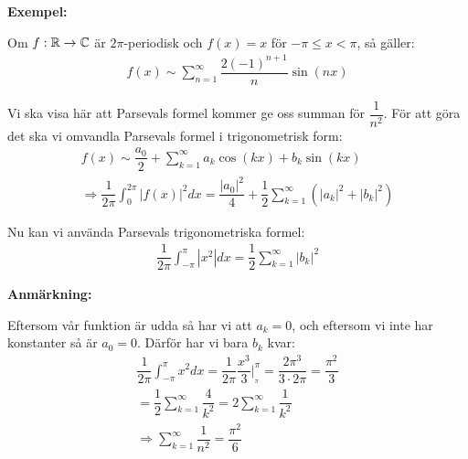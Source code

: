 \par\bigskip
\noindent\textbf{Exempel:}\par
\noindent Om $f:\mathbb{R}\to\mathbb{C}$ är $2\pi$-periodisk och $f(x) = x$ för $-\pi\leq x<\pi$, så gäller:
\begin{equation*}
  \begin{gathered}
    f(x)\sim \sum_{n=1}^{\infty}\dfrac{2(-1)^{n+1}}{n}\sin(nx)
  \end{gathered}
\end{equation*}
\par\bigskip
\noindent Vi ska visa här att Parsevals formel kommer ge oss summan för $\dfrac{1}{n^2}$. För att göra det ska vi omvandla Parsevals formel i trigonometrisk form:
\begin{equation*}
  \begin{gathered}
    f(x)\sim\dfrac{a_0}{2}+\sum_{k=1}^{\infty}a_k\cos(kx)+b_k\sin(kx)\\
    \Rightarrow \dfrac{1}{2\pi}\int_{0}^{2\pi}\left|f(x)\right|^2dx = \dfrac{\left|a_0\right|^2}{4}+\dfrac{1}{2}\sum_{k=1}^{\infty}\left(\left|a_k\right|^2+\left|b_k\right|^2\right)
  \end{gathered}
\end{equation*}
\par\bigskip
\noindent Nu kan vi använda Parsevals trigonometriska formel:
\begin{equation*}
  \begin{gathered}
    \dfrac{1}{2\pi}\int_{-\pi}^{\pi}\left|x^2\right|dx = \dfrac{1}{2}\sum_{k=1}^{\infty}\left|b_k\right|^2
  \end{gathered}
\end{equation*}
\par\bigskip
\noindent\textbf{Anmärkning:}\par
\noindent Eftersom vår funktion är udda så har vi att $a_k = 0$, och eftersom vi inte har konstanter så är $a_0=0$. Därför har vi bara $b_k$ kvar:
\begin{equation*}
  \begin{gathered}
    \dfrac{1}{2\pi}\int_{-\pi}^{\pi}x^2dx = \dfrac{1}{2\pi}\dfrac{x^3}{3}|_{_\pi}^\pi = \dfrac{2\pi^3}{3\cdot2\pi} = \dfrac{\pi^2}{3}\\
    = \dfrac{1}{2}\sum_{k=1}^{\infty}\dfrac{4}{k^2} = 2\sum_{k=1}^{\infty}\dfrac{1}{k^2}\\
    \Rightarrow \sum_{k=1}^{\infty}\dfrac{1}{n^2} = \dfrac{\pi^2}{6}
  \end{gathered}
\end{equation*}
\par\bigskip
